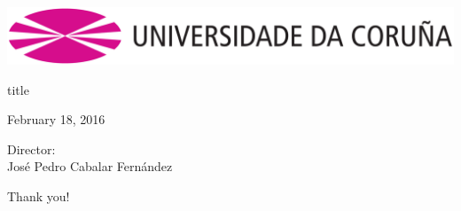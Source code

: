 \documentclass[english]{beamer}
\newcommand{\director}{
\begin{small}
Director:\\José Pedro Cabalar Fernández
\end{small}
}
\begin{document}
\begin{frame}
\centering
\vfill
\includegraphics[width=0.6\linewidth]{imagenes/anagramaUDC.png}
\vfill
\begin{beamercolorbox}[rounded=true,shadow=true,sep=8pt,center]{title}
\inserttitle \par
\end{beamercolorbox}
\vfill
\centering
\insertauthor
\vfill
February 18, 2016\par
\begin{center}
\director \par 
\vfill
\alert{Thank you!}
\end{center}
\end{frame}
\end{document}
